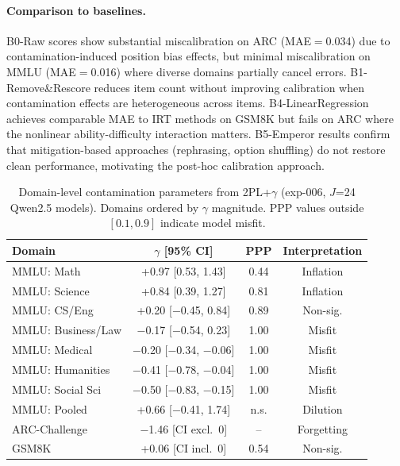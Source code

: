 \paragraph{Comparison to baselines.}
B0-Raw scores show substantial miscalibration on ARC (MAE$=$0.034) due to contamination-induced position bias effects, but minimal miscalibration on MMLU (MAE$=$0.016) where diverse domains partially cancel errors. B1-Remove\&Rescore reduces item count without improving calibration when contamination effects are heterogeneous across items. B4-LinearRegression achieves comparable MAE to IRT methods on GSM8K but fails on ARC where the nonlinear ability-difficulty interaction matters. B5-Emperor \citep{xu2025emperor} results confirm that mitigation-based approaches (rephrasing, option shuffling) do not restore clean performance, motivating the post-hoc calibration approach.

\begin{table}[t]
\centering
\caption{Domain-level contamination parameters from 2PL+$\gamma$ (exp-006, $J$=24 Qwen2.5 models). Domains ordered by $\gamma$ magnitude. PPP values outside $[0.1, 0.9]$ indicate model misfit.}
\label{tab:domain_gamma}
\small
\begin{tabular}{lccc}
\toprule
Domain & $\gamma$ [95\% CI] & PPP & Interpretation \\
\midrule
MMLU: Math & +0.97 [0.53, 1.43] & 0.44 & Inflation \\
MMLU: Science & +0.84 [0.39, 1.27] & 0.81 & Inflation \\
MMLU: CS/Eng & +0.20 [$-$0.45, 0.84] & 0.89 & Non-sig. \\
MMLU: Business/Law & $-$0.17 [$-$0.54, 0.23] & 1.00 & Misfit \\
MMLU: Medical & $-$0.20 [$-$0.34, $-$0.06] & 1.00 & Misfit \\
MMLU: Humanities & $-$0.41 [$-$0.78, $-$0.04] & 1.00 & Misfit \\
MMLU: Social Sci & $-$0.50 [$-$0.83, $-$0.15] & 1.00 & Misfit \\
\midrule
MMLU: Pooled & +0.66 [$-$0.41, 1.74] & n.s. & Dilution \\
ARC-Challenge & $-$1.46 [CI excl.\ 0] & -- & Forgetting \\
GSM8K & +0.06 [CI incl.\ 0] & 0.54 & Non-sig. \\
\bottomrule
\end{tabular}
\end{table}

